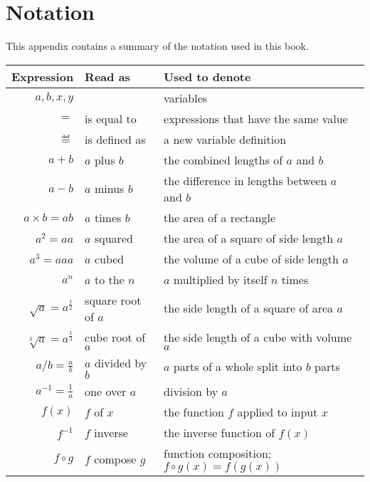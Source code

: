 
\chapter{Notation}
\label{appendix:notation}
\vspace{-7mm}

This appendix contains a summary of the notation used in this book.



{ \small
\noindent
\begin{tabularx}{\textwidth}{@{}rlp{5.9cm}@{}} 
\toprule
Expression  	&	Read as  	& Used to denote			\\
\midrule
$a,b,x,y$	
	& 
	& variables \\
$=$	
	& is equal to 
	& expressions that have the same value \\ %
$\eqdef$
	& is defined as 
	& a new variable definition  \\
$a+b$
	& $a$ plus $b$
	& the combined lengths of $a$ and $b$ \\
$a-b$	
	& $a$ minus $b$
	& the difference in lengths between $a$ and $b$ \\
$a\times b = ab$
	& $a$ times $b$
	& the area of a rectangle   \\
$a^2= aa$
	& $a$ squared 
	& the area of a square of side length $a$ \\
$a^3= aaa$
	& $a$ cubed 
	& the volume of a cube of side length $a$ \\
$a^n$
	& $a$ to the $n$
	& $a$ multiplied by itself $n$ times 		\\
$\sqrt{a} = a^{\frac{1}{2}}$
	& square root of $a$
	& the side length of a square of area $a$ \\
$\sqrt[3]{a}= a^{\frac{1}{3}}$
	& cube root of $a$
	& the side length of a cube with volume $a$  \\
$a/b = \frac{a}{b}$
	& $a$ divided by $b$
	& $a$ parts of a whole split into $b$ parts \\[0.8mm]
$a^{-1}= \frac{1}{a}$
	& one over $a$
	& division by $a$ 					\\[2mm]
$f(x)$	
	& $f$ of $x$
	& the function $f$ applied to input $x$ 	\\
$f^{-1}$ 
	& $f$ inverse 
	& the inverse function of $f(x)$   \\
$f \circ g$ 
	& $f$ compose $g$ 
	& function composition; $f \circ g(x) = f(g(x))$   \\[2mm]

\end{tabularx}}
